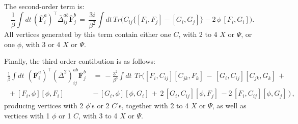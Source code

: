 \documentclass[a4paper,11pt]{article}
\begin{document}
The second-order term is:
\begin{equation*}
\frac{1}{\beta }\int dt\,(\overline{\mathbf{F}}_{i}^{a})^{\intercal }
\overline{\Delta }_{ij}^{ab}\overline{\mathbf{F}}_{j}^{b}\,=\,
\frac{3i}{\beta^{2}}\int dt\,Tr\bigg( C_{ij}\Big\{[F_{i},F_{j}]-[G_{i},G_{j}]\Big\}-2\,\phi\,[F_{i},G_{i}]\bigg) .
\end{equation*}
All vertices generated by this term contain either one $C$, with 2 to 4 $X$ or $\Psi$, or 
one $\phi$, with 3 or 4 $X$ or $\Psi$.

Finally, the third-order contibution is as follows:
\begin{align*}
\frac{1}{\beta }\int dt\,~(\overline{\mathbf{F}}_{i}^{a})^{\intercal }
(\overline{\Delta }^{2})_{ij}^{ab}\overline{\mathbf{F}}_{j}^{b}\,&=\,
-\frac{3^{2}}{\beta ^{3}}\int dt\,~Tr\bigg([F_{i},C_{ij}][C_{jk},F_{k}]\,-\,[G_{i},C_{ij}][C_{jk},G_{k}]\,+ \\
\,+[F_{i},\phi][\phi,F_{i}]\,&-\,[G_{i},\phi][\phi,G_{i}]\,+\,2\,[G_{i},C_{ij}][\phi,F_{j}]\,
-2\,[F_i,C_{ij}][\phi,G_{j}]\,\bigg)\, ,
\end{align*}
producing vertices with 2 $\phi$'s or 2 $C$'s, together with 2 to 4 $X$ or $\Psi$, as well as
vertices with 1 $\phi$ or 1 $C$, with 3 to 4 $X$ or $\Psi$.
\end{document}
